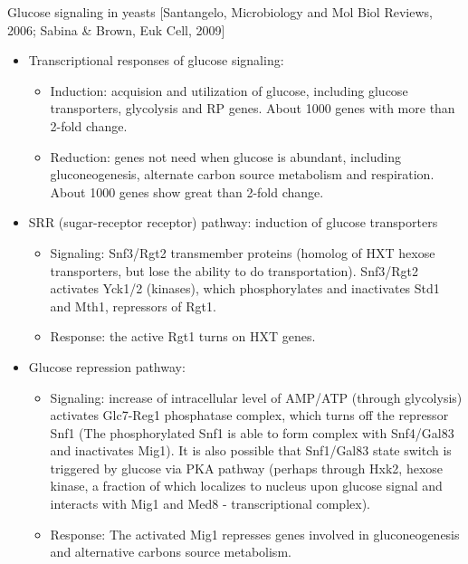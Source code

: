 \documentclass{report}
\begin{document}
Glucose signaling in yeasts [Santangelo, Microbiology and Mol Biol Reviews, 2006; Sabina \& Brown, Euk Cell, 2009]
\begin{itemize}
\item Transcriptional responses of glucose signaling: 
\begin{itemize}
	\item Induction: acquision and utilization of glucose, including glucose transporters, glycolysis and RP genes. About 1000 genes with more than 2-fold change. 
	\item Reduction: genes not need when glucose is abundant, including gluconeogenesis, alternate carbon source metabolism and respiration. About 1000 genes show great than 2-fold change.  
\end{itemize}

\item SRR (sugar-receptor receptor) pathway: induction of glucose transporters
\begin{itemize}
	\item Signaling: Snf3/Rgt2 transmember proteins (homolog of HXT hexose transporters, but lose the ability to do transportation). Snf3/Rgt2 activates Yck1/2 (kinases), which phosphorylates and inactivates Std1 and Mth1, repressors of Rgt1. 
	\item Response: the active Rgt1 turns on HXT genes. 
\end{itemize}
	
\item Glucose repression pathway: 
\begin{itemize}
	\item Signaling: increase of intracellular level of AMP/ATP (through glycolysis) activates Glc7-Reg1 phosphatase complex, which turns off the repressor Snf1 (The phosphorylated Snf1 is able to form complex with Snf4/Gal83 and inactivates Mig1). It is also possible that Snf1/Gal83 state switch is triggered by glucose via PKA pathway (perhaps through Hxk2, hexose kinase, a fraction of which localizes to nucleus upon glucose signal and interacts with Mig1 and Med8 - transcriptional complex). 
	\item Response: The activated Mig1 represses genes involved in gluconeogenesis and alternative carbons source metabolism. 
\end{itemize}
	

\end{itemize}
\end{document}
